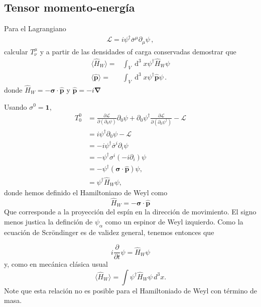 \subsection{Tensor momento-energía}
\label{sec:tens-momento-energi}
\begin{frame}


Para el Lagrangiano
\begin{align*}
    \mathcal{L}=i \psi^{\dagger} \overline{\sigma}^{\mu} \partial_{\mu} \psi\,,
\end{align*}
calcular $T^{\mu}_{\nu}$ y a partir de  las densidades of carga conservadas demostrar que
\begin{align*}
  \langle\hat{H}_{W}\rangle=&\int_{V} \operatorname{d}^{3} x \psi^{\dagger} \hat{H}_{W} \psi \\
 \langle\hat{\boldsymbol{p}}\rangle=&\int_{V} \operatorname{d}^{3} x \psi^{\dagger}\hat{\boldsymbol{p}} \psi\,. 
\end{align*}
donde $\hat{H}_{W}=-\boldsymbol{\sigma} \cdot \hat{\boldsymbol{p}}$ y $\hat{\boldsymbol{p}}=-i \boldsymbol{\nabla}$


  Usando $\sigma^{0}=\mathbf{1}$,
\begin{align}
  T^0_0&=\frac{\partial\mathcal{L}}{\partial\left(\partial_0\psi\right)}\partial_0\psi+\partial_0\psi^\dagger\frac{\partial\mathcal{L}}{\partial\left(\partial_0\psi^\dagger\right)}-\mathcal{L}\nonumber\\
  &=i\psi^\dagger\partial_0\psi-\mathcal{L}\nonumber\\
  &=-i\psi^\dagger \overline{\sigma}^i\partial_i\psi\nonumber\\
  &=-\psi^\dagger \sigma^i \left( -i \partial_i\right)\psi\nonumber\\
  &=-\psi^\dagger(\boldsymbol{\sigma}\cdot\widehat{\mathbf{p}})\psi,\nonumber\\
  \label{eq:118qft}
  &=\psi^\dagger\hat{H}_{W} \psi,
\end{align}
donde hemos definido el Hamiltoniano de Weyl como
\begin{equation}
  \label{eq:denshal}
  \hat{H}_W= -\boldsymbol{\sigma}\cdot\widehat{\mathbf{p}}
\end{equation}
Que corresponde a la proyección del espín en la dirección de movimiento. El signo menos justica la definción de $\psi_{\alpha}$ como un espinor de Weyl izquierdo. Como la ecuación de Scröndinger es de validez general, tenemos entonces que

\begin{equation}
  i\frac{\partial}{\partial t}\psi=\hat{H}_W \psi
\end{equation}
y, como en mecánica clásica usual
\begin{equation}
  \label{eq:99qft}
  \langle\hat{H}_W\rangle=\int \psi^\dagger\hat{H}_W \psi\,d^3x.
\end{equation}
Note que esta relación no es posible para el Hamiltoniado de Weyl con término de masa.


\end{frame}
